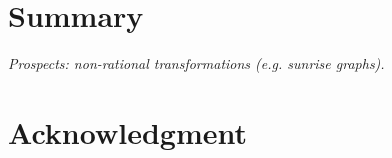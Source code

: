 \documentclass[12pt,a4paper]{article}
\begin{document}
\section{Summary}
\label{sec:4}

{\it Prospects: non-rational transformations (e.g. sunrise graphs). }

\section*{Acknowledgment}


\end{document}
